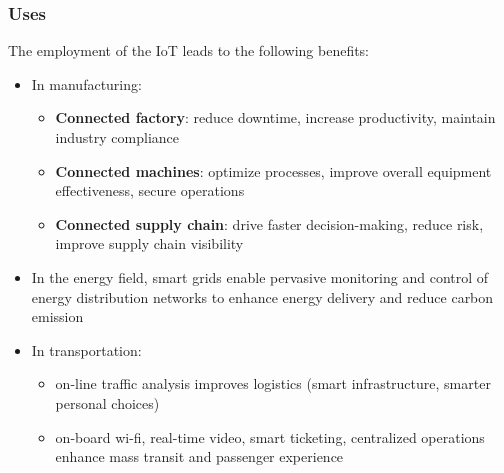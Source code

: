 \documentclass{beamer}
\begin{document}
\begin{frame}
	\frametitle{Uses}
	The employment of the IoT leads to the following benefits:
	\begin{itemize}
		\item In manufacturing:
		\begin{itemize}
			\item\textbf{Connected factory}: reduce downtime, increase productivity, maintain industry compliance
			\item \textbf{Connected machines}: optimize processes, improve overall equipment effectiveness, secure operations
			\item \textbf{Connected supply chain}: drive faster decision-making, reduce risk, improve supply chain visibility
		\end{itemize}
	\item In the energy field, smart grids enable pervasive monitoring and control of energy distribution networks to enhance energy delivery and reduce carbon emission
	\item In transportation:
	\begin{itemize}
		\item on-line traffic analysis improves logistics (smart infrastructure, smarter personal choices)
		\item on-board wi-fi, real-time video, smart ticketing, centralized operations enhance mass transit and passenger experience
	\end{itemize}
	\end{itemize}
\end{frame}
\end{document}
